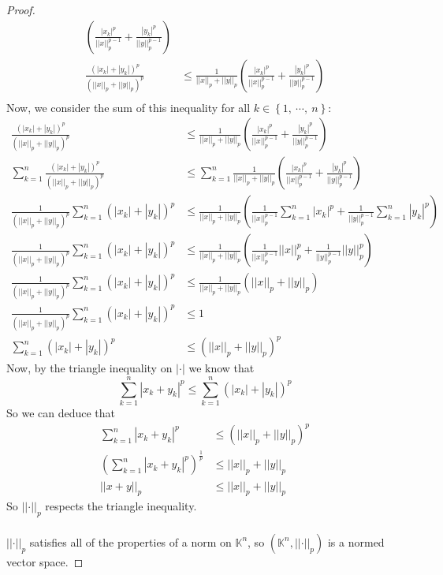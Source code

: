 \documentclass{article}
\newcommand{\norm}[1]{\left|\left|#1\right|\right|}
\newcommand{\abs}[1]{\left|#1\right|}
\newcommand{\parens}[1]{\left(#1\right)}
\newcommand{\bracks}[1]{\left\{#1\right\}}
\newcommand{\K}{\mathbb{K}}
\begin{document}
\begin{proof}
\begin{align*}
    \parens{\frac{\abs{x_k}^p}{\norm{x}_p^{p-1}} + 
    \frac{\abs{y_k}^p}{\norm{y}_p^{p-1}}} \\
    \frac{\parens{\abs{x_k} + \abs{y_k}}^p}{
    \parens{\norm{x}_p + \norm{y}_p}^p} 
    &\leq \frac{1}{\norm{x}_p + \norm{y}_p}
    \parens{\frac{\abs{x_k}^p}{\norm{x}_p^{p-1}} + 
    \frac{\abs{y_k}^p}{\norm{y}_p^{p-1}}} \\
    \end{align*}
    Now, we consider the sum of this inequality for all $k \in 
    \bracks{1,\ \cdots,\ n}$:
    \begin{align*}
    \frac{\parens{\abs{x_k} + \abs{y_k}}^p}{
    \parens{\norm{x}_p + \norm{y}_p}^p} 
    &\leq \frac{1}{\norm{x}_p + \norm{y}_p}
    \parens{\frac{\abs{x_k}^p}{\norm{x}_p^{p-1}} + 
    \frac{\abs{y_k}^p}{\norm{y}_p^{p-1}}} \\
    \sum_{k=1}^n\frac{\parens{\abs{x_k} + \abs{y_k}}^p}{
    \parens{\norm{x}_p + \norm{y}_p}^p} 
    &\leq \sum_{k=1}^n\frac{1}{\norm{x}_p + \norm{y}_p}
    \parens{\frac{\abs{x_k}^p}{\norm{x}_p^{p-1}} + 
    \frac{\abs{y_k}^p}{\norm{y}_p^{p-1}}} \\
    \frac{1}{\parens{\norm{x}_p + \norm{y}_p}^p} \sum_{k=1}^n 
    \parens{\abs{x_k} + \abs{y_k}}^p
    &\leq \frac{1}{\norm{x}_p + \norm{y}_p}
    \parens{\frac{1}{\norm{x}_p^{p-1}}\sum_{k=1}^n\abs{x_k}^p + 
    \frac{1}{\norm{y}_p^{p-1}}\sum_{k=1}^n\abs{y_k}^p} \\
    \frac{1}{\parens{\norm{x}_p + \norm{y}_p}^p} \sum_{k=1}^n 
    \parens{\abs{x_k} + \abs{y_k}}^p
    &\leq \frac{1}{\norm{x}_p + \norm{y}_p}
    \parens{\frac{1}{\norm{x}_p^{p-1}}\norm{x}_p^p + 
    \frac{1}{\norm{y}_p^{p-1}}\norm{y}_p^p} \\
    \frac{1}{\parens{\norm{x}_p + \norm{y}_p}^p} \sum_{k=1}^n 
    \parens{\abs{x_k} + \abs{y_k}}^p
    &\leq \frac{1}{\norm{x}_p + \norm{y}_p}
    \parens{\norm{x}_p + \norm{y}_p} \\
    \frac{1}{\parens{\norm{x}_p + \norm{y}_p}^p} \sum_{k=1}^n 
    \parens{\abs{x_k} + \abs{y_k}}^p &\leq 1 \\
    \sum_{k=1}^n 
    \parens{\abs{x_k} + \abs{y_k}}^p &\leq \parens{\norm{x}_p 
    + \norm{y}_p}^p
    \end{align*}
    Now, by the triangle inequality on $\abs{\cdot}$ we know that 
    $$\sum_{k=1}^n\abs{x_k + y_k}^p \leq \sum_{k=1}^n
    \parens{\abs{x_k} 
    + \abs{y_k}}^p$$
    So we can deduce that
    \begin{align*}
    \sum_{k=1}^n\abs{x_k + y_k}^p &\leq \parens{\norm{x}_p 
    + \norm{y}_p}^p \\
    \parens{\sum_{k=1}^n\abs{x_k + y_k}^p}^{\frac{1}{p}} &\leq 
    \norm{x}_p + \norm{y}_p \\
    \norm{x+y}_p &\leq \norm{x}_p + \norm{y}_p
    \end{align*}
    So $\norm{\cdot}_p$ respects the triangle inequality.\\\\
    $\norm{\cdot}_p$ satisfies all of the properties of a norm on
    $\K^n$, so $\parens{\K^n, \norm{\cdot}_p}$ is a normed vector 
    space.
    \end{proof}
    
\end{document}
